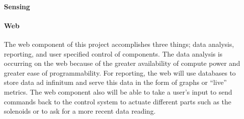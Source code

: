 \paragraph{Sensing}
\paragraph{Web}
The web component of this project accomplishes three things; data analysis, reporting, and user specified control of components. The data analysis is occurring on the web because of the greater availability of compute power and greater ease of programmability. For reporting, the web will use databases to store data ad infinitum and serve this data in the form of graphs or ``live'' metrics. The web component also will be able to take a user's input to send commands back to the control system to actuate different parts such as the solenoids or to ask for a more recent data reading.
